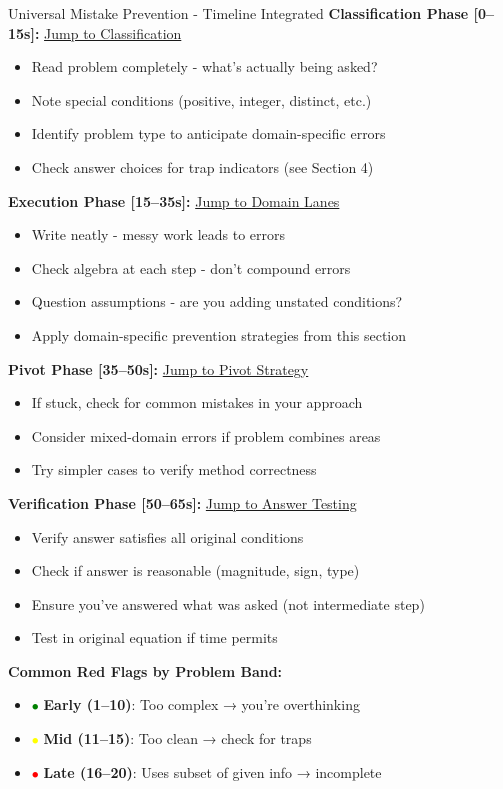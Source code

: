 \documentclass{article}
\begin{document}
\begin{trapbox}{Universal Mistake Prevention - Timeline Integrated}
\textbf{Classification Phase [0--15s]:} \hyperlink{classify-15}{Jump to Classification}
\begin{itemize}[nosep]
\item[$\square$] Read problem completely - what's actually being asked?
\item[$\square$] Note special conditions (positive, integer, distinct, etc.)
\item[$\square$] Identify problem type to anticipate domain-specific errors
\item[$\square$] Check answer choices for trap indicators (see Section 4)
\end{itemize}

\textbf{Execution Phase [15--35s]:} \hyperlink{domain-lanes}{Jump to Domain Lanes}
\begin{itemize}[nosep]
\item[$\square$] Write neatly - messy work leads to errors
\item[$\square$] Check algebra at each step - don't compound errors
\item[$\square$] Question assumptions - are you adding unstated conditions?
\item[$\square$] Apply domain-specific prevention strategies from this section
\end{itemize}

\textbf{Pivot Phase [35--50s]:} \hyperlink{pivot35}{Jump to Pivot Strategy}
\begin{itemize}[nosep]
\item[$\square$] If stuck, check for common mistakes in your approach
\item[$\square$] Consider mixed-domain errors if problem combines areas
\item[$\square$] Try simpler cases to verify method correctness
\end{itemize}

\textbf{Verification Phase [50--65s]:} \hyperlink{answer-test-50}{Jump to Answer Testing}
\begin{itemize}[nosep]
\item[$\square$] Verify answer satisfies all original conditions
\item[$\square$] Check if answer is reasonable (magnitude, sign, type)
\item[$\square$] Ensure you've answered what was asked (not intermediate step)
\item[$\square$] Test in original equation if time permits
\end{itemize}

\textbf{Common Red Flags by Problem Band:}
\begin{itemize}[nosep]
\item \textcolor{green}{$\bullet$} \textbf{Early (1--10)}: Too complex → you're overthinking
\item \textcolor{yellow}{$\bullet$} \textbf{Mid (11--15)}: Too clean → check for traps
\item \textcolor{red}{$\bullet$} \textbf{Late (16--20)}: Uses subset of given info → incomplete
\end{itemize}
\end{trapbox}
\end{document}
